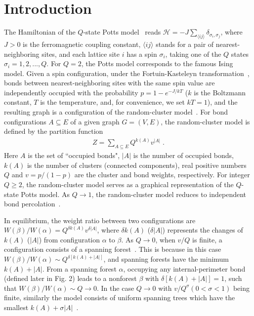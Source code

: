 \documentclass[aps,pre,twocolumn,superscriptaddress,longbibliography,floatfix]{revtex4-2}
\begin{document}
\section{\label{sec1}Introduction }
The Hamiltonian of the $Q$-state Potts model~\cite{wupotts} reads $\mathcal{H}=-J\sum _{\langle ij\rangle}\delta_{\sigma_i,\sigma_j}$, where $J>0$ is the ferromagnetic coupling constant, $\langle ij\rangle$ stands for a pair of nearest-neighboring sites, and each lattice site $i$ has a spin $\sigma_i$, taking one of the $Q$ states $\sigma_i=1,2,...,Q$. For $Q=2$, the Potts model corresponds to the famous Ising model. Given a spin configuration, under the Fortuin-Kasteleyn transformation~\cite{kasteleyn1969phase,fortuin1972random},  bonds between nearest-neighboring sites with the same spin value are independently occupied with the probability $p=1-e^{-J/kT}$ ($k$ is the Boltzmann constant, $T$ is the temperature, and, for convenience, we set $kT=1$), 
and the resulting graph is a configuration of the random-cluster model~\cite{grimmett2006random}.
For bond configurations $A\subseteq{E}$ of a given graph $G=(V,E)$, the random-cluster model is defined by the partition function
\begin{align}
    Z=\sum_{A\subseteq{E}} Q^{k(A)}v^{|A|} \;.
\end{align}
Here $A$ is the set of ``occupied bonds", $|A|$ is the number of occupied bonds, $k(A)$ is the number of clusters (connected components), real positive numbers $Q$ and $v=p/(1-p)$ are the cluster and bond weights, respectively.
For integer $Q\ge2$, the random-cluster model serves as a graphical representation of the $Q$-state Potts model.
As $Q \to 1$, the random-cluster model reduces to independent bond percolation~\cite{stauffer1992introduction}. 

{In equilibrium, the weight ratio between two configurations are $W(\beta) / W(\alpha) = Q^{\delta k(A)} v^{\delta |A|} $, where $\delta k(A)$ ($\delta |A|$) represents the changes of $k(A)$ ($|A|$) from configuration $\alpha$ to $\beta$. As $Q \rightarrow 0$, when $v/Q$ is finite, a configuration consists of a spanning forest~\cite{jacobsen2005spanning,grimmett2006random}. This is because in this case $W(\beta) / W(\alpha) \sim Q^{\delta [k(A)+|A|]} $, and spanning forests have the minimum $k(A)+|A|$. From a spanning forest $\alpha$, occupying any internal-perimeter bond (defined later in Fig. 2) leads to a nonforest $\beta$ with $\delta[k(A)+|A|]=1$, such that $W(\beta) / W(\alpha) \sim Q \rightarrow 0$. In the case $Q \rightarrow 0$ with $v/Q^{\sigma}(0< \sigma <1)$ being finite, similarly the model consists of uniform spanning trees which have the smallest $k(A)+\sigma |A|$~\cite{jacobsen2005spanning,grimmett2006random}.}
\end{document}
